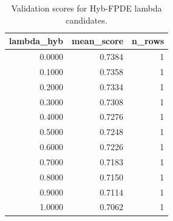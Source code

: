 \begin{table}[t]
\caption{Validation scores for Hyb-FPDE lambda candidates.}
\label{tab:lambda_distribution_computed}
\centering
\begin{tabular}{rrr}
\toprule
lambda\_hyb & mean\_score & n\_rows \\
\midrule
0.0000 & 0.7384 & 1 \\
0.1000 & 0.7358 & 1 \\
0.2000 & 0.7334 & 1 \\
0.3000 & 0.7308 & 1 \\
0.4000 & 0.7276 & 1 \\
0.5000 & 0.7248 & 1 \\
0.6000 & 0.7226 & 1 \\
0.7000 & 0.7183 & 1 \\
0.8000 & 0.7150 & 1 \\
0.9000 & 0.7114 & 1 \\
1.0000 & 0.7062 & 1 \\
\bottomrule
\end{tabular}

\end{table}

